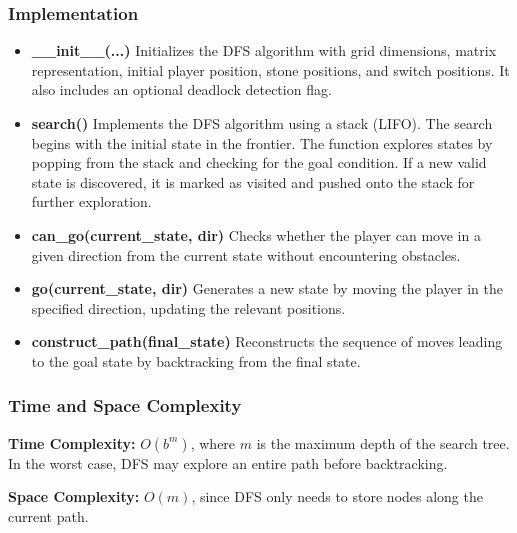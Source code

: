\subsubsection{Implementation}
\begin{itemize}
    \item \textbf{\_\_init\_\_(...)}  
    Initializes the DFS algorithm with grid dimensions, matrix representation, initial player position, stone positions, and switch positions. It also includes an optional deadlock detection flag.

    \item \textbf{search()}  
    Implements the DFS algorithm using a stack (LIFO). The search begins with the initial state in the frontier. The function explores states by popping from the stack and checking for the goal condition. If a new valid state is discovered, it is marked as visited and pushed onto the stack for further exploration.

    \item \textbf{can\_go(current\_state, dir)}  
    Checks whether the player can move in a given direction from the current state without encountering obstacles.

    \item \textbf{go(current\_state, dir)}  
    Generates a new state by moving the player in the specified direction, updating the relevant positions.

    \item \textbf{construct\_path(final\_state)}  
    Reconstructs the sequence of moves leading to the goal state by backtracking from the final state.

\end{itemize}


\subsubsection{Time and Space Complexity}
\textbf{Time Complexity:} \( O(b^m) \), where \( m \) is the maximum depth of the search tree. In the worst case, DFS may explore an entire path before backtracking.

\textbf{Space Complexity:} \( O(m) \), since DFS only needs to store nodes along the current path.